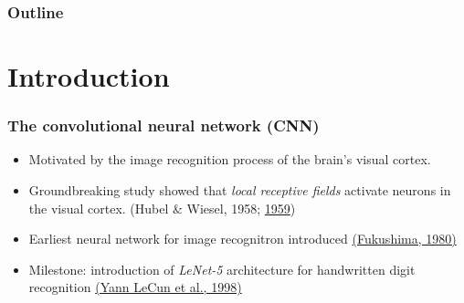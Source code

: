\documentclass[smaller]{beamer}
\begin{document}
\maketitle
\begin{frame}
  \frametitle{Outline}
  \tableofcontents
\end{frame}

  

 
 
\section{Introduction}
\begin{frame}
  \frametitle{The convolutional neural network (CNN)}
  \pause


  \begin{itemize}[<+->]
  \item Motivated by the image recognition process of the brain's visual cortex.

  \item Groundbreaking study showed that \textit{local receptive fields}  activate neurons
    in the visual cortex. (Hubel \& Wiesel, 1958; \href{https://www.ncbi.nlm.nih.gov/pmc/articles/PMC1363130/pdf/jphysiol01298-0128.pdf}{1959})

  \item Earliest neural network for image recognitron introduced \href{https://www.rctn.org/bruno/public/papers/Fukushima1980.pdf}{(Fukushima, 1980)}

  \item Milestone: introduction of \textit{LeNet-5} architecture for handwritten digit recognition \href{http://yann.lecun.com/exdb/publis/pdf/lecun-98.pdf}{(Yann LeCun et al., 1998)}
  \end{itemize}
  
\end{frame}
\end{document}
